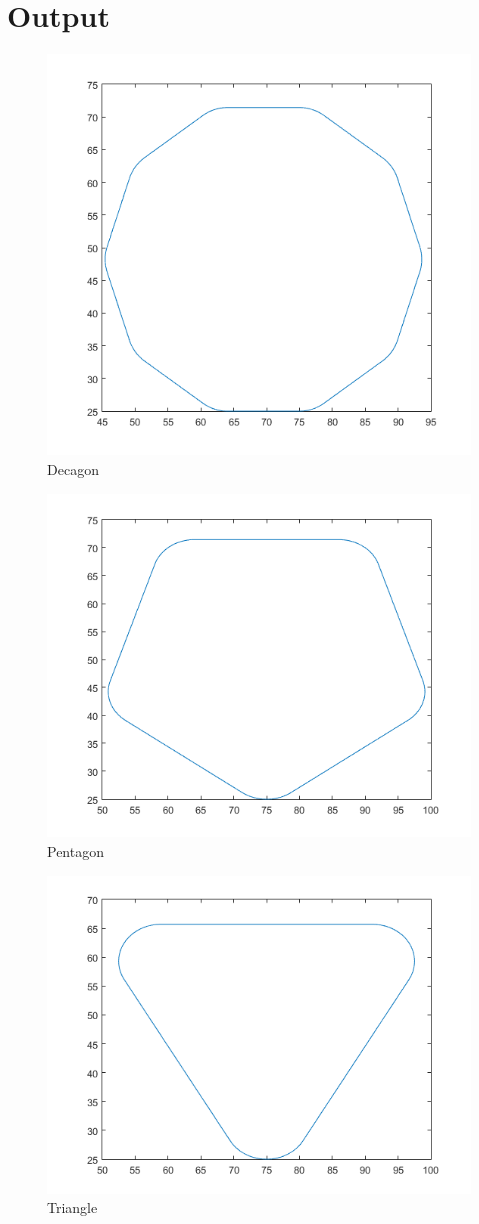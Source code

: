 \documentclass{article}
\begin{document}
\section{Output}
\begin{figure}
\centering
\includegraphics[width=0.7\linewidth]{10}
\caption[Decagon]{Decagon}
\end{figure}
\begin{figure}
\centering
\includegraphics[width=0.7\linewidth]{5}
\caption[Pentagon]{Pentagon}
\end{figure}
\begin{figure}
	\centering
	\includegraphics[width=0.7\linewidth]{3}
	\caption[Triangle]{Triangle}
\end{figure}
\end{document}
